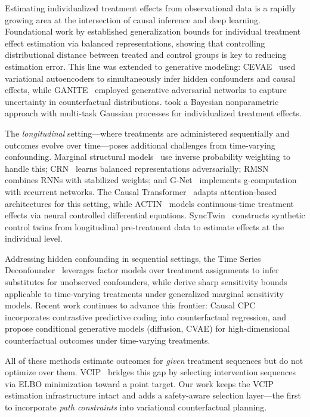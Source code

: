 \documentclass{article}
\begin{document}
Estimating individualized treatment effects from observational data is a rapidly growing area at the intersection of causal inference and deep learning. Foundational work by \citet{shalit2017estimating} established generalization bounds for individual treatment effect estimation via balanced representations, showing that controlling distributional distance between treated and control groups is key to reducing estimation error. This line was extended to generative modeling: CEVAE~\citep{louizos2017cevae} used variational autoencoders to simultaneously infer hidden confounders and causal effects, while GANITE~\citep{yoon2018ganite} employed generative adversarial networks to capture uncertainty in counterfactual distributions. \citet{alaa2017bayesian} took a Bayesian nonparametric approach with multi-task Gaussian processes for individualized treatment effects.

The \emph{longitudinal} setting---where treatments are administered sequentially and outcomes evolve over time---poses additional challenges from time-varying confounding. Marginal structural models~\citep{robins2000marginal} use inverse probability weighting to handle this; CRN~\citep{bica2020crn} learns balanced representations adversarially; RMSN~\citep{lim2018forecasting} combines RNNs with stabilized weights; and G-Net~\citep{li2021gnet} implements g-computation with recurrent networks. The Causal Transformer~\citep{melnychuk2022causal} adapts attention-based architectures for this setting, while ACTIN~\citep{seedat2022actin} models continuous-time treatment effects via neural controlled differential equations. SyncTwin~\citep{qian2021synctwin} constructs synthetic control twins from longitudinal pre-treatment data to estimate effects at the individual level.

Addressing hidden confounding in sequential settings, the Time Series Deconfounder~\citep{bica2020tsd} leverages factor models over treatment assignments to infer substitutes for unobserved confounders, while \citet{frauen2023sharp} derive sharp sensitivity bounds applicable to time-varying treatments under generalized marginal sensitivity models. Recent work continues to advance this frontier: Causal CPC~\citep{kim2024causalcpc} incorporates contrastive predictive coding into counterfactual regression, and \citet{wu2024counterfactual} propose conditional generative models (diffusion, CVAE) for high-dimensional counterfactual outcomes under time-varying treatments.

All of these methods estimate outcomes for \emph{given} treatment sequences but do not optimize over them. VCIP~\citep{melnychuk2025vcip} bridges this gap by selecting intervention sequences via ELBO minimization toward a point target. Our work keeps the VCIP estimation infrastructure intact and adds a safety-aware selection layer---the first to incorporate \emph{path constraints} into variational counterfactual planning.
\end{document}
